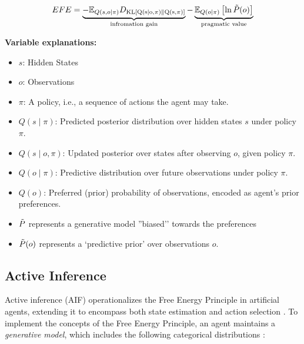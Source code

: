 \[
EFE=\underbrace{-\mathbb{E}_{Q(s, o \mid \pi)} D_\mathrm{{KL} \left[ Q(s \mid o, \pi) \parallel Q(s, \pi) \right] }}_{\text{infromation gain}} - \underbrace{\mathbb{E}_{Q(o \mid \pi)} \left[ \ln \Tilde{P}(o) \right]}_{\text{pragmatic value}}
\]






\textbf{Variable explanations:}
\begin{itemize}
  \item $s$: Hidden States
  \item $o$: Observations
  \item $\pi$: A policy, i.e., a sequence of actions the agent may take.
  \item $Q(s \mid \pi)$: Predicted posterior distribution over hidden states $s$ under policy $\pi$.
  \item $Q(s \mid o, \pi)$: Updated posterior over states after observing $o$, given policy $\pi$.
  \item $Q(o \mid \pi)$: Predictive distribution over future observations under policy $\pi$.
  \item $Q(o)$: Preferred (prior) probability of observations, encoded as agent’s prior preferences.
  \item \(\Tilde{P}\) represents a generative model ''biased'’ towards the preferences
  \item \(\Tilde{P}(o)\) represents a ‘predictive prior’ over observations \(o\).
 
\end{itemize}




\subsection{Active Inference}
Active inference (AIF) operationalizes the Free Energy Principle in artificial agents, extending it to encompass both state estimation and action selection \cite{sedlak_equilibrium_2024, lanillos_active_2021}. To implement the concepts of the Free Energy Principle, an agent maintains a \textit{generative model}, which includes the following categorical distributions \cite{heins_pymdp_2022}:

